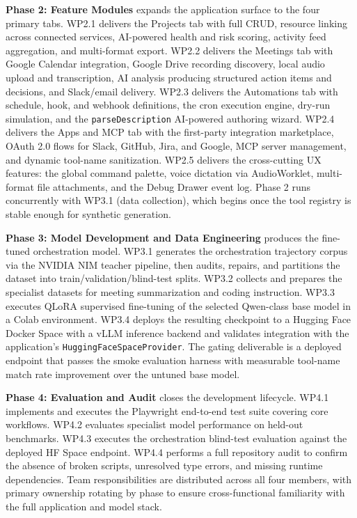 \documentclass[conference]{IEEEtran}
\begin{document}
\textbf{Phase 2: Feature Modules} expands the application surface to the four primary tabs. WP2.1 delivers the Projects tab with full CRUD, resource linking across connected services, AI-powered health and risk scoring, activity feed aggregation, and multi-format export. WP2.2 delivers the Meetings tab with Google Calendar integration, Google Drive recording discovery, local audio upload and transcription, AI analysis producing structured action items and decisions, and Slack/email delivery. WP2.3 delivers the Automations tab with schedule, hook, and webhook definitions, the cron execution engine, dry-run simulation, and the \texttt{parseDescription} AI-powered authoring wizard. WP2.4 delivers the Apps and MCP tab with the first-party integration marketplace, OAuth 2.0 flows for Slack, GitHub, Jira, and Google, MCP server management, and dynamic tool-name sanitization. WP2.5 delivers the cross-cutting UX features: the global command palette, voice dictation via AudioWorklet, multi-format file attachments, and the Debug Drawer event log. Phase 2 runs concurrently with WP3.1 (data collection), which begins once the tool registry is stable enough for synthetic generation.

\textbf{Phase 3: Model Development and Data Engineering} produces the fine-tuned orchestration model. WP3.1 generates the orchestration trajectory corpus via the NVIDIA NIM teacher pipeline, then audits, repairs, and partitions the dataset into train/validation/blind-test splits. WP3.2 collects and prepares the specialist datasets for meeting summarization and coding instruction. WP3.3 executes QLoRA supervised fine-tuning of the selected Qwen-class base model in a Colab environment. WP3.4 deploys the resulting checkpoint to a Hugging Face Docker Space with a vLLM inference backend and validates integration with the application's \texttt{HuggingFaceSpaceProvider}. The gating deliverable is a deployed endpoint that passes the smoke evaluation harness with measurable tool-name match rate improvement over the untuned base model.

\textbf{Phase 4: Evaluation and Audit} closes the development lifecycle. WP4.1 implements and executes the Playwright end-to-end test suite covering core workflows. WP4.2 evaluates specialist model performance on held-out benchmarks. WP4.3 executes the orchestration blind-test evaluation against the deployed HF Space endpoint. WP4.4 performs a full repository audit to confirm the absence of broken scripts, unresolved type errors, and missing runtime dependencies. Team responsibilities are distributed across all four members, with primary ownership rotating by phase to ensure cross-functional familiarity with the full application and model stack.
\end{document}
